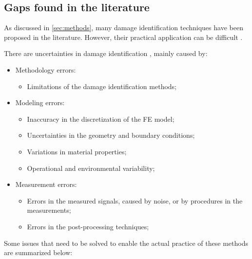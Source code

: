 \subsection{Gaps found in the literature}

As discussed in \autoref{sec:methods}, many damage identification techniques have been proposed in the literature. However, their practical application can be difficult \cite{Doebling1998,Ooijevaar2014}.

There are uncertainties in damage identification \cite{xu2017smart}, mainly caused by:
\begin{itemize}
    \item Methodology errors:
    \vspace{0.5em}
    \begin{itemize}
    \item Limitations of the damage identification methods;
    \end{itemize}
    \vspace{-0.5em}
    \item Modeling errors:
    \vspace{0.5em}
    \begin{itemize}
    \item Inaccuracy in the discretization of the FE model;    
    \item Uncertainties in the geometry and boundary conditions;
    \item Variations in material properties;
    \item Operational and environmental variability;
    \end{itemize}
    \vspace{-0.5em}
    \item Measurement errors:
    \vspace{0.5em}
    \begin{itemize}
    \item Errors in the measured signals, caused by noise, or by procedures in the measurements;    
    \item Errors in the post-processing techniques;
    \end{itemize}
\end{itemize}

Some issues that need to be solved to enable the actual practice of these methods are summarized below:

